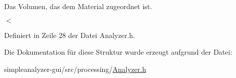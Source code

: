 Das Volumen, das dem Material zugeordnet ist. 

$<$ 

Definiert in Zeile 28 der Datei Analyzer.\-h.



Die Dokumentation für diese Struktur wurde erzeugt aufgrund der Datei\-:\begin{DoxyCompactItemize}
\item 
simpleanalyzer-\/gui/src/processing/\hyperlink{Analyzer_8h}{Analyzer.\-h}\end{DoxyCompactItemize}
